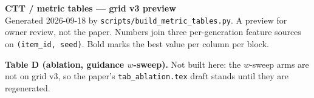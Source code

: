 \documentclass{article}
\begin{document}
\begin{center}
{\Large\bfseries CTT / \segue{} metric tables --- grid v3 preview}\\[3pt]

\small Generated 2026-09-18 by \texttt{scripts/build\_metric\_tables.py}. A preview for owner review,
not the paper. Numbers join three per-generation feature sources on \texttt{(item\_id, seed)}.
Bold marks the best value per column per block.
\end{center}
\vspace{1em}

\vspace{0.5em}

\vspace{0.5em}

\vspace{1em}
\noindent\textbf{Table D (ablation, guidance $w$-sweep).} Not built here: the $w$-sweep arms are not on
grid v3, so the paper's \texttt{tab\_ablation.tex} draft stands until they are regenerated.


\end{document}
